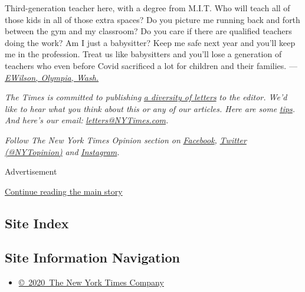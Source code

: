 Third-generation teacher here, with a degree from M.I.T. Who will teach
all of those kids in all of those extra spaces? Do you picture me
running back and forth between the gym and my classroom? Do you care if
there are qualified teachers doing the work? Am I just a babysitter?
Keep me safe next year and you'll keep me in the profession. Treat us
like babysitters and you'll lose a generation of teachers who even
before Covid sacrificed a lot for children and their families. ---
\href{https://nyti.ms/2BQRDE8\#permid=108076999}{\emph{EWilson, Olympia,
Wash.}}

\emph{The Times is committed to publishing}
\href{https://www.nytimes3xbfgragh.onion/2019/01/31/opinion/letters/letters-to-editor-new-york-times-women.html}{\emph{a
diversity of letters}} \emph{to the editor. We'd like to hear what you
think about this or any of our articles. Here are some}
\href{https://help.nytimes3xbfgragh.onion/hc/en-us/articles/115014925288-How-to-submit-a-letter-to-the-editor}{\emph{tips}}\emph{.
And here's our email:}
\href{mailto:letters@NYTimes.com}{\emph{letters@NYTimes.com}}\emph{.}

\emph{Follow The New York Times Opinion section on}
\href{https://www.facebookcorewwwi.onion/nytopinion}{\emph{Facebook}}\emph{,}
\href{http://twitter.com/NYTOpinion}{\emph{Twitter (@NYTopinion)}}
\emph{and}
\href{https://www.instagram.com/nytopinion/}{\emph{Instagram}}\emph{.}

Advertisement

\protect\hyperlink{after-bottom}{Continue reading the main story}

\hypertarget{site-index}{%
\subsection{Site Index}\label{site-index}}

\hypertarget{site-information-navigation}{%
\subsection{Site Information
Navigation}\label{site-information-navigation}}

\begin{itemize}
\tightlist
\item
  \href{https://help.nytimes3xbfgragh.onion/hc/en-us/articles/115014792127-Copyright-notice}{©~2020~The
  New York Times Company}
\end{itemize}

